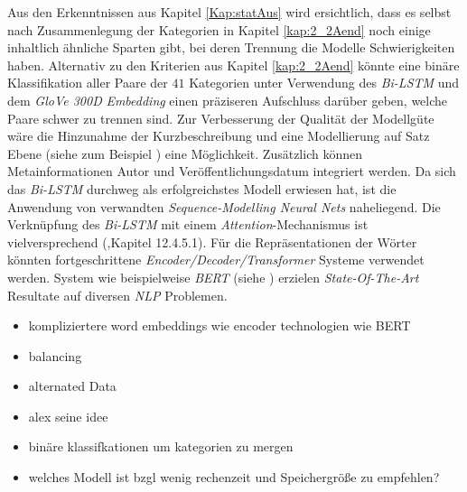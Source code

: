 \documentclass[a4paper,11pt]{article}
\begin{document}
Aus den Erkenntnissen aus Kapitel \ref{Kap:statAus}
wird ersichtlich, dass es selbst nach Zusammenlegung der Kategorien in Kapitel \ref{kap:2_2Aend} noch einige inhaltlich ähnliche Sparten gibt, bei deren Trennung die Modelle Schwierigkeiten haben. Alternativ zu den Kriterien aus Kapitel \ref{kap:2_2Aend} könnte eine binäre Klassifikation aller Paare der $41$ Kategorien unter Verwendung des \textit{Bi-LSTM} und dem \textit{GloVe 300D} \textit{Embedding} einen präziseren Aufschluss darüber geben, welche Paare schwer zu trennen sind. Zur Verbesserung der Qualität der Modellgüte wäre die Hinzunahme der Kurzbeschreibung und eine Modellierung auf Satz Ebene (siehe zum Beispiel \cite{sentenceRep}) eine Möglichkeit. Zusätzlich können Metainformationen Autor und Veröffentlichungsdatum integriert werden. Da sich das \textit{Bi-LSTM} durchweg als erfolgreichstes Modell erwiesen hat, ist die Anwendung von verwandten \textit{Sequence-Modelling Neural Nets} naheliegend. Die Verknüpfung des \textit{Bi-LSTM} mit einem \textit{Attention}-Mechanismus ist  vielversprechend (\cite{deepL},Kapitel 12.4.5.1). Für die Repräsentationen der Wörter könnten fortgeschrittene \textit{Encoder/Decoder/Transformer} Systeme verwendet werden. System wie beispielweise \textit{BERT} (siehe \cite{bert}) erzielen \textit{State-Of-The-Art} Resultate auf diversen \textit{NLP} Problemen.


\begin{itemize}

    \item kompliziertere word embeddings wie encoder technologien wie BERT
    \item balancing
    \item alternated Data
    \item alex seine idee
    \item binäre klassifkationen um kategorien zu mergen 
    \item welches Modell ist bzgl wenig rechenzeit und Speichergröße zu empfehlen?
\end{itemize}


\newpage
\end{document}
